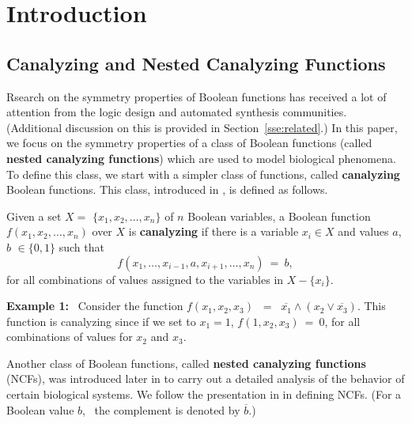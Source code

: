 \section{Introduction} 
\label{sec:intro}

\subsection{Canalyzing and Nested Canalyzing Functions}
\label{sse:ncf_def}

Rsearch on the symmetry properties of Boolean
functions has received a lot of attention from the
logic design and automated synthesis communities. 
(Additional discussion on this is provided in Section~\ref{sse:related}.)
In this paper, we focus on the symmetry properties of
a class of Boolean functions (called \textbf{nested canalyzing functions})
which are used to model biological phenomena.
To define this class, we start with a simpler
class of functions, called \textbf{canalyzing} Boolean functions.
This class, introduced in \cite{Kauffman-1969}, is defined as follows.

\begin{definition}\label{def:canalyzing}
Given a set $X = $ $\{x_1, x_2, \ldots, x_n\}$ of $n$  Boolean variables,
a Boolean function $f(x_1, x_2, \ldots, x_n)$ over $X$ is \textbf{canalyzing}
if there is a variable $x_i \in X$ and values $a$, $b$ $\in \{0,1\}$ such that
\[
f(x_1, \ldots, x_{i-1}, a, x_{i+1}, \ldots, x_n) ~=~ b, 
\]
for all combinations of values assigned to the variables in $X - \{x_i\}$.
\end{definition}

\medskip

\noindent
\textbf{Example 1:}~ Consider the function 
$f(x_1, x_2, x_3)$ $~=~$ $\overline{x_1} \wedge (x_2 \vee \overline{x_3})$.
This function is canalyzing since if we set to $x_1 = 1$,
$f(1, x_2, x_3) ~=~ 0$, for all combinations of values for 
$x_2$ and $x_3$. %

\medskip

Another class of Boolean functions, called \textbf{nested canalyzing functions} (NCFs),
was introduced later in \cite{Kauffman-etal-2003} to carry out a detailed
analysis of the behavior of certain biological systems.
We follow the presentation in \cite{Layne-2011} in defining NCFs.
(For a Boolean value $b$,~ the complement is denoted by $\overline{b}$.)


